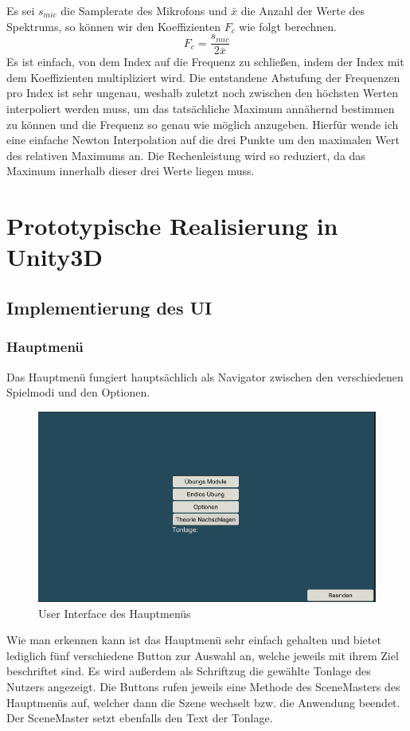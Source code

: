 Es sei $s_{mic}$ die Samplerate des Mikrofons und $\bar{x}$ die Anzahl der Werte des Spektrums, so können wir den Koeffizienten $F_c$ wie folgt berechnen.
$$ F_c = \frac{s_{mic}}{2\bar{x}} $$
Es ist einfach, von dem Index auf die Frequenz zu schließen, indem der Index mit dem Koeffizienten multipliziert wird. Die entstandene Abstufung der Frequenzen pro Index ist sehr ungenau, weshalb zuletzt noch zwischen den höchsten Werten interpoliert werden muss, um das tatsächliche Maximum annähernd bestimmen zu können und die Frequenz so genau wie möglich anzugeben. Hierfür wende ich eine einfache Newton Interpolation auf die drei Punkte um den maximalen Wert des relativen Maximums an. Die Rechenleistung wird so reduziert, da das Maximum innerhalb dieser drei Werte liegen muss. 


\chapter{Prototypische Realisierung in Unity3D}

\section{Implementierung des UI}

\subsection*{Hauptmenü}
Das Hauptmenü fungiert hauptsächlich als Navigator zwischen den verschiedenen Spielmodi und den Optionen. 
\begin{figure}[H]
    \centering
    \includegraphics[width=1\textwidth]{Bilder/hauptmenue.png}
    \caption{User Interface des Hauptmenüs}
    \label{sec:hps_algo}
\end{figure}
Wie man erkennen kann ist das Hauptmenü sehr einfach gehalten und bietet lediglich fünf verschiedene Button zur Auswahl an, welche jeweils mit ihrem Ziel beschriftet sind. Es wird außerdem als Schriftzug die gewählte Tonlage des Nutzers angezeigt. Die Buttons rufen jeweils eine Methode des SceneMasters des Hauptmenüs auf, welcher dann die Szene wechselt bzw. die Anwendung beendet. Der SceneMaster setzt ebenfalls den Text der Tonlage. 


